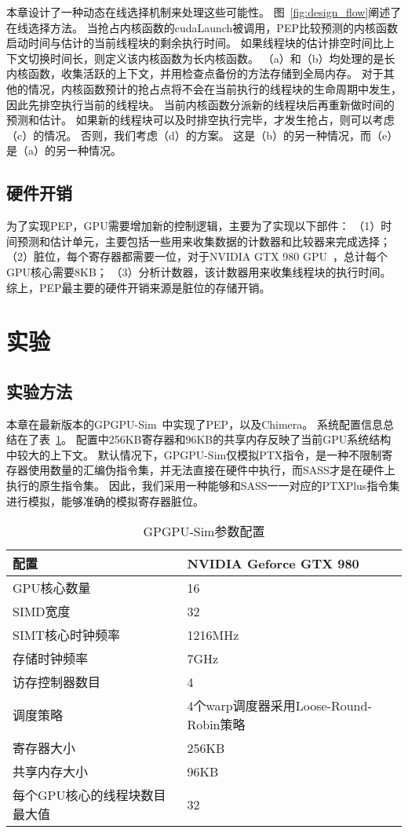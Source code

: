本章设计了一种动态在线选择机制来处理这些可能性。
图~\ref{fig:design_flow}阐述了在线选择方法。
当抢占内核函数的cudaLaunch被调用，PEP比较预测的内核函数启动时间与估计的当前线程块的剩余执行时间。
如果线程块的估计排空时间比上下文切换时间长，则定义该内核函数为长内核函数。
（a）和（b）均处理的是长内核函数，收集活跃的上下文，并用检查点备份的方法存储到全局内存。
对于其他的情况，内核函数预计的抢占点将不会在当前执行的线程块的生命周期中发生，
因此先排空执行当前的线程块。
当前内核函数分派新的线程块后再重新做时间的预测和估计。
如果新的线程块可以及时排空执行完毕，才发生抢占，则可以考虑（c）的情况。
否则，我们考虑（d）的方案。
这是（b）的另一种情况，而（e）是（a）的另一种情况。



\subsection{硬件开销}
为了实现PEP，GPU需要增加新的控制逻辑，主要为了实现以下部件：
（1）时间预测和估计单元，主要包括一些用来收集数据的计数器和比较器来完成选择；
（2）脏位，每个寄存器都需要一位，对于NVIDIA GTX 980 GPU~，总计每个GPU核心需要8KB；
（3）分析计数器，该计数器用来收集线程块的执行时间。
综上，PEP最主要的硬件开销来源是脏位的存储开销。


\section{实验}
\label{sec:pepexperiment}

\subsection{实验方法}
本章在最新版本的GPGPU-Sim~中实现了PEP，以及Chimera。
系统配置信息总结在了表~\ref{table:configuration}。
配置中256KB寄存器和96KB的共享内存反映了当前GPU系统结构中较大的上下文。
默认情况下，GPGPU-Sim仅模拟PTX指令，是一种不限制寄存器使用数量的汇编伪指令集，并无法直接在硬件中执行，而SASS才是在硬件上执行的原生指令集。
因此，我们采用一种能够和SASS一一对应的PTXPlus指令集进行模拟，能够准确的模拟寄存器脏位。

\begin{table}[t]
  \centering
  \begin{tabular}{|l|l|}  
    \hline
    配置 & NVIDIA Geforce GTX 980\\
    \hline
    \hline
    GPU核心数量 & 16\\
    \hline
    SIMD宽度 & 32\\
    \hline
    SIMT核心时钟频率 & 1216MHz\\
    \hline
    存储时钟频率 & 7GHz\\
    \hline
    访存控制器数目 & 4 \\
    \hline
    调度策略 & 4个warp调度器采用Loose-Round-Robin策略\\
    \hline
    寄存器大小 & 256KB\\
    \hline
    共享内存大小 & 96KB\\
    \hline
    每个GPU核心的线程块数目最大值 & 32\\
    \hline
  \end{tabular}
  \caption{GPGPU-Sim参数配置}
 \label{table:configuration}
\end{table}


